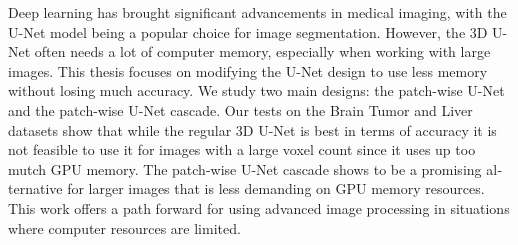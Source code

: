 \null\vfil
\begin{otherlanguage}{english}
\begin{center}\textsf{\textbf{\abstractname}}\end{center}

\noindent Deep learning has brought significant advancements in medical imaging,
with the U-Net model being a popular choice for image segmentation.
However, the 3D U-Net often needs a lot of computer memory, especially when working with large images.
This thesis focuses on modifying the U-Net design to use less memory without losing much accuracy.
We study two main designs: the patch-wise U-Net and the patch-wise U-Net cascade.
Our tests on the Brain Tumor and Liver datasets show that while the regular 3D U-Net is best in terms of accuracy it is
not feasible to use it for images with a large voxel count since it uses up too mutch GPU memory.
The patch-wise U-Net cascade shows to be a promising alternative for larger images that is less demanding on GPU memory resources.
This work offers a path forward for using advanced image processing in situations where computer resources are limited.
\end{otherlanguage}
\vfil\null

